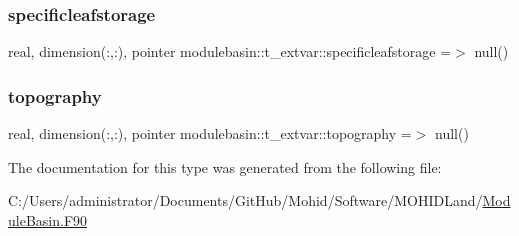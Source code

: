 \mbox{\label{structmodulebasin_1_1t__extvar_af581c0bb7220e1daff7abf12afe23558}} 
\subsubsection{\texorpdfstring{specificleafstorage}{specificleafstorage}}
{\footnotesize\ttfamily real, dimension(\+:,\+:), pointer modulebasin\+::t\+\_\+extvar\+::specificleafstorage =$>$ null()\hspace{0.3cm}{\ttfamily [private]}}

\mbox{\label{structmodulebasin_1_1t__extvar_a5f497a8f619e77f57406f93924b0a0d3}} 
\subsubsection{\texorpdfstring{topography}{topography}}
{\footnotesize\ttfamily real, dimension(\+:,\+:), pointer modulebasin\+::t\+\_\+extvar\+::topography =$>$ null()\hspace{0.3cm}{\ttfamily [private]}}



The documentation for this type was generated from the following file\+:\begin{DoxyCompactItemize}
\item 
C\+:/\+Users/administrator/\+Documents/\+Git\+Hub/\+Mohid/\+Software/\+M\+O\+H\+I\+D\+Land/\mbox{\hyperlink{_module_basin_8_f90}{Module\+Basin.\+F90}}\end{DoxyCompactItemize}
